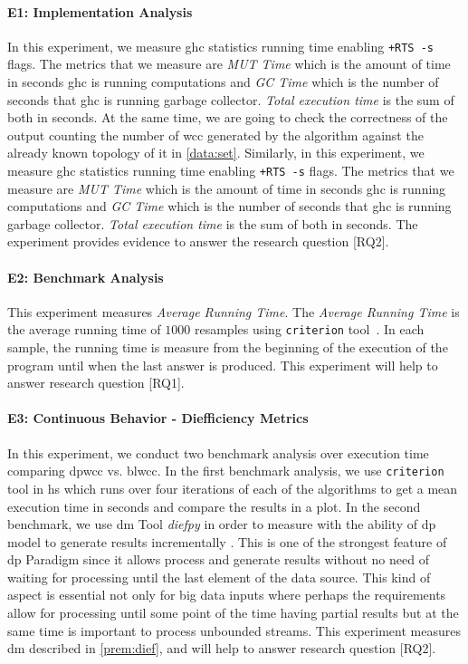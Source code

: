 \paragraph{E1: Implementation Analysis}
In this experiment, we measure \acrshort{ghc} statistics running time enabling \texttt{+RTS -s} flags. The metrics that we measure are \emph{MUT Time} which is the amount of time in seconds \acrshort{ghc} is running computations and \emph{GC Time} which is the number of seconds that \acrshort{ghc} is running garbage collector. \emph{Total execution time} is the sum of both in seconds. At the same time, we are going to check the correctness of the output counting the number of \acrshort{wcc} generated by the algorithm against the already known topology of it in \autoref{data:set}. 
Similarly, in this experiment, we measure \acrshort{ghc} statistics running time enabling \texttt{+RTS -s} flags.
The metrics that we measure are \emph{MUT Time} which is the amount of time in seconds \acrshort{ghc} is running computations and \emph{GC Time} which is the number of seconds that \acrshort{ghc} is running garbage collector. 
\emph{Total execution time} is the sum of both in seconds. The experiment provides evidence to answer the research question [RQ2].

\paragraph{E2: Benchmark Analysis}
This experiment measures \emph{Average Running Time}.
The \emph{Average Running Time} is the average running time of $1000$ resamples using \texttt{criterion} tool~\cite{criterion}. 
In each sample, the running time is measure from the beginning of the execution of the program until when the last answer is produced.
This experiment will help to answer research question [RQ1].

\paragraph{E3: Continuous Behavior - Diefficiency Metrics}
In this experiment, we conduct two benchmark analysis over execution time comparing \acrshort{dpwcc} vs. \acrshort{blwcc}. 
In the first benchmark analysis, we use \texttt{criterion} \cite{criterion} tool in \acrshort{hs} which runs over four iterations of each of the algorithms to get a mean execution time in seconds and compare the results in a plot. 
In the second benchmark, we use \acrfull{dm} Tool \emph{diefpy} \cite{diefpy} in order to measure with the ability of \acrshort{dp} model to generate results incrementally \cite{diefpaper}. 
This is one of the strongest feature of \acrshort{dp} Paradigm since it allows process and generate results without no need of waiting for processing until the last element of the data source. 
This kind of aspect is essential not only for big data inputs where perhaps the requirements allow for processing until some point of the time having partial results but at the same time is important to process unbounded streams.
This experiment measures \acrlong{dm} described in \autoref{prem:dief}, and will help to answer research question [RQ2].

